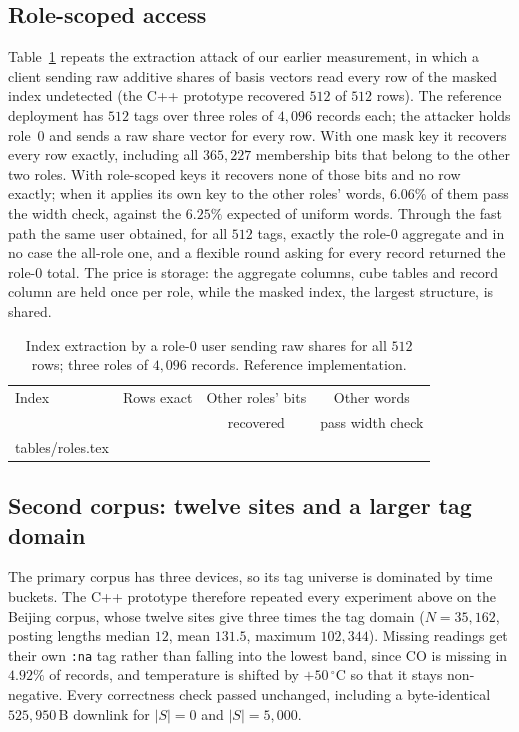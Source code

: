 \documentclass[11pt,a4paper]{article}
\newlength{\tblwidth}\setlength{\tblwidth}{\linewidth}
\begin{document}
\subsection{Role-scoped access}
\label{sec:authresult}
Table~\ref{tab:roles} repeats the extraction attack of our earlier
measurement, in which a client sending raw additive shares of basis vectors
read every row of the masked index undetected (the C++ prototype recovered
$512$ of $512$ rows). The reference deployment has $512$ tags over three roles
of $4{,}096$ records each; the attacker holds role~$0$ and sends a raw share
vector for every row. With one mask key it recovers every row exactly, including
all $365{,}227$ membership bits that belong to the other two roles. With
role-scoped keys it recovers none of those bits and no row exactly; when it
applies its own key to the other roles' words, $6.06\%$ of them pass the width
check, against the $6.25\%$ expected of uniform words. Through the fast path the
same user obtained, for all $512$ tags, exactly the role-$0$ aggregate and in no
case the all-role one, and a flexible round asking for every record returned
the role-$0$ total. The price is storage: the aggregate columns, cube tables and
record column are held once per role, while the masked index, the largest
structure, is shared.

\begin{table}[htbp]
\caption{Index extraction by a role-$0$ user sending raw shares for all
$512$ rows; three roles of $4{,}096$ records. Reference implementation.}
\label{tab:roles}
\centering
\footnotesize
\begin{tabular*}{\tblwidth}{@{\extracolsep{\fill}}lccc@{}}
\toprule
Index & Rows exact & Other roles' bits & Other words \\
 & & recovered & pass width check \\
\midrule
{} tables/roles.tex 
\bottomrule
\end{tabular*}
\end{table}

\subsection{Second corpus: twelve sites and a larger tag domain}
\label{sec:secondcorpus}
The primary corpus has three devices, so its tag universe is dominated by time
buckets. The C++ prototype therefore repeated every experiment above on the
Beijing corpus, whose twelve sites give three times the tag domain
($N=35{,}162$, posting lengths median $12$, mean $131.5$, maximum $102{,}344$).
Missing readings get their own \texttt{:na} tag rather than falling into the
lowest band, since CO is missing in $4.92\%$ of records, and temperature is
shifted by $+50\,^\circ$C so that it stays non-negative. Every correctness
check passed unchanged, including a byte-identical $525{,}950$\,B downlink for
$|S|=0$ and $|S|=5{,}000$.
\end{document}

